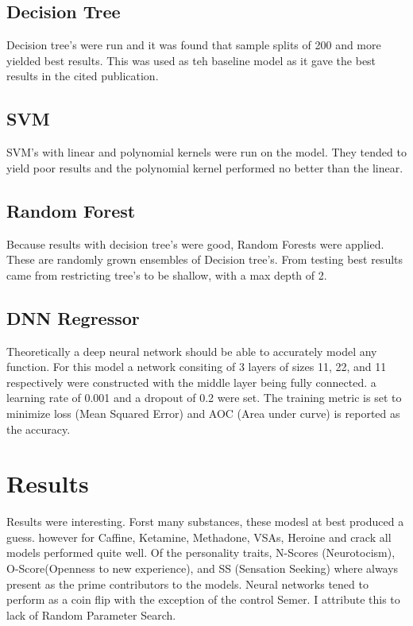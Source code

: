 \documentclass[12pt]{article}
\begin{document}
\begin{flushleft}
		\subsection{Decision Tree}
		Decision tree's were run and it was found that sample splits of 200 and more yielded best results. This was used as teh baseline model as it gave the best results in the cited publication.\\
		
		\subsection{SVM}
		SVM's with linear and polynomial kernels were run on the model. They tended to yield poor results and the polynomial kernel performed no better than the linear. \\
		
		\subsection{Random Forest}
		Because results with decision tree's were good, Random Forests were applied. These are randomly grown ensembles of Decision tree's. From testing best results came from restricting tree's to be shallow, with a max depth of 2.\\
		
		\subsection{DNN Regressor}
		Theoretically a deep neural network should be able to accurately model any function. For this model a network consiting of 3 layers of sizes 11, 22, and 11 respectively were constructed with the middle layer being fully connected. a learning rate of 0.001 and a dropout of 0.2 were set. The training metric is set to minimize loss (Mean Squared Error) and AOC (Area under curve) is reported as the accuracy.\\
		
		\section{Results}
		Results were interesting. Forst many substances, these modesl at best produced a guess. however for Caffine, Ketamine, Methadone, VSAs, Heroine and crack all models performed quite well. Of the personality traits, N-Scores (Neurotocism), O-Score(Openness to new experience), and SS (Sensation Seeking) where always present as the prime contributors to the models. Neural networks tened to perform as a coin flip with the exception of the control Semer. I attribute this to lack of Random Parameter Search.\\
		


\end{flushleft}
\end{document}
